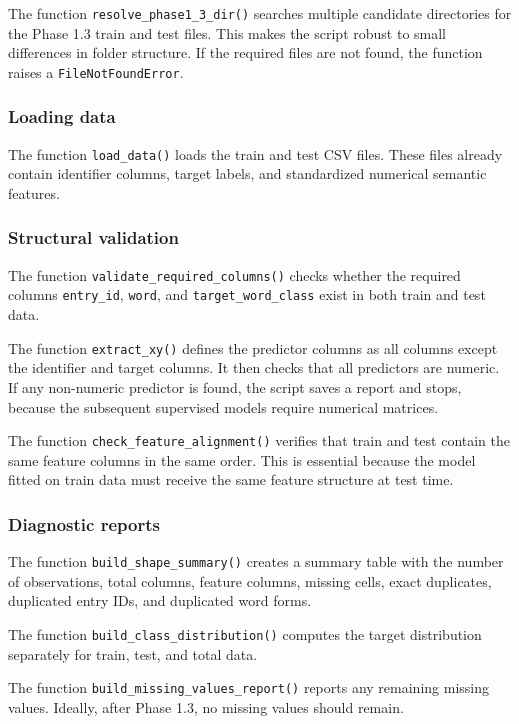 \documentclass{ipgpmaster}
\begin{document}
The function \texttt{resolve\_phase1\_3\_dir()} searches multiple candidate directories for the Phase 1.3 train and test files. This makes the script robust to small differences in folder structure. If the required files are not found, the function raises a \texttt{FileNotFoundError}.

\subsubsection{Loading data}

The function \texttt{load\_data()} loads the train and test CSV files. These files already contain identifier columns, target labels, and standardized numerical semantic features.

\subsubsection{Structural validation}

The function \texttt{validate\_required\_columns()} checks whether the required columns \texttt{entry\_id}, \texttt{word}, and \texttt{target\_word\_class} exist in both train and test data.

The function \texttt{extract\_xy()} defines the predictor columns as all columns except the identifier and target columns. It then checks that all predictors are numeric. If any non-numeric predictor is found, the script saves a report and stops, because the subsequent supervised models require numerical matrices.

The function \texttt{check\_feature\_alignment()} verifies that train and test contain the same feature columns in the same order. This is essential because the model fitted on train data must receive the same feature structure at test time.

\subsubsection{Diagnostic reports}

The function \texttt{build\_shape\_summary()} creates a summary table with the number of observations, total columns, feature columns, missing cells, exact duplicates, duplicated entry IDs, and duplicated word forms.

The function \texttt{build\_class\_distribution()} computes the target distribution separately for train, test, and total data.

The function \texttt{build\_missing\_values\_report()} reports any remaining missing values. Ideally, after Phase 1.3, no missing values should remain.
\end{document}
